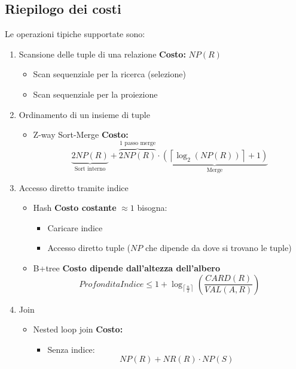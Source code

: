 \documentclass[a4paper,twoside]{article}
\begin{document}
\subsection{Riepilogo dei costi}
Le operazioni tipiche supportate sono:
\begin{enumerate}
  \item Scansione delle tuple di una relazione \textbf{Costo: } \( NP(R) \) 
    \begin{itemize}
      \item Scan sequenziale per la ricerca (selezione)
      \item Scan sequenziale per la proiezione
    \end{itemize}

  \item Ordinamento di un insieme di tuple
    \begin{itemize}
      \item Z-way Sort-Merge \textbf{Costo: }
        \[
          \underbrace{2 NP(R)}_{\text{Sort interno}}
          + \overbrace{2NP(R)}^{\text{1 passo merge}}
          \cdot
          \underbrace{\left(
          \left\lceil \log_2(NP(R)) \right\rceil + 1
      \right)}_{\text{Merge}}
        \]
    \end{itemize}

  \item Accesso diretto tramite indice
    \begin{itemize}
      \item Hash \textbf{Costo costante} \( \approx 1 \) bisogna:
        \begin{itemize}
          \item Caricare indice
          \item Accesso diretto tuple (\( NP \) che dipende da dove si trovano le tuple)
        \end{itemize}

      \item B+tree \textbf{Costo dipende dall'altezza dell'albero}
        \[
          ProfonditaIndice \le 1 + \log_{\left\lceil \frac{n}{2} \right\rceil }
          \left( \frac{CARD(R)}{VAL(A,R)} \right)
        \] 
    \end{itemize}

  \item Join
    \begin{itemize}
      \item Nested loop join \textbf{Costo: }
        \begin{itemize}
          \item Senza indice:
            \[
              NP(R) + NR(R) \cdot NP(S)
            \] 


\end{itemize}
\end{itemize}
\end{enumerate}
\end{document}
